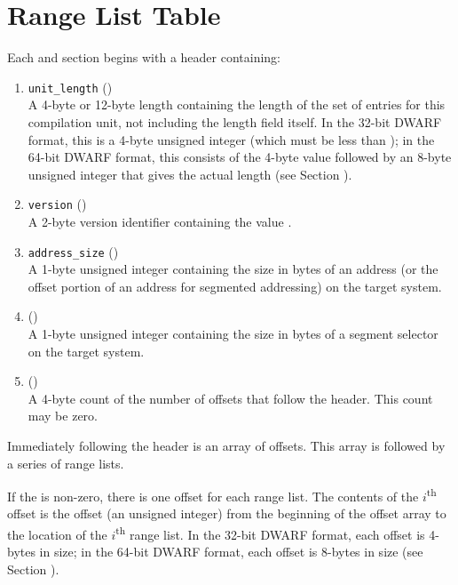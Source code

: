 \section{Range List Table}
\label{app:ranglisttable}
Each \dotdebugrnglists{} and \dotdebugrnglistsdwo{} section 
begins with a header containing:
\begin{enumerate}[1. ]
\item \texttt{unit\_length} () \\
A 4-byte or 12-byte length containing the length of
the set of entries for this compilation unit, not
including the length field itself. In the 32-bit
DWARF format, this is a 4-byte unsigned integer
(which must be less than \xfffffffzero); in the 64-bit
DWARF format, this consists of the 4-byte value
\wffffffff followed by an 8-byte unsigned integer
that gives the actual length (see 
Section ).

\item  \texttt{version} (\HFTuhalf) \\
A 2-byte version identifier containing the value
\versiondotdebugrnglists{}. 

\item	\texttt{address\_size} (\HFTubyte) \\
A 1-byte unsigned integer containing the size in
bytes of an address (or the offset portion of an
address for segmented addressing) on the target
system.

\item	\HFNsegmentselectorsize{} (\HFTubyte) \\
A 1-byte unsigned integer containing the size in
bytes of a segment selector on the target system.

\item   \HFNoffsetentrycount{} (\HFTuword) \\
A 4-byte count of the number of offsets
that follow the header.
\bb
This count may be zero.
\eb
\end{enumerate}

Immediately following the header is an array of offsets.
This array is followed by a series of range lists. 

\bb
If the \HFNoffsetentrycount{} is non-zero, there 
\eb
is one offset for each range list. 
The contents
of the $i$\textsuperscript{th} offset is the offset 
\bb
(an unsigned integer)
\eb
from the
beginning of the offset array to the location of the 
$i$\textsuperscript{th} range list.
\bb
In the 32-bit DWARF format, each offset is 4-bytes in size; 
in the 64-bit DWARF format, each offset is 8-bytes in size 
(see Section ).
\eb

